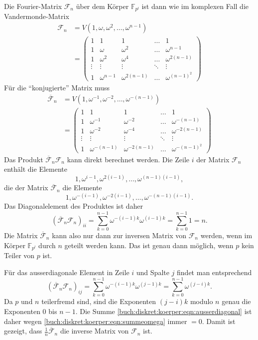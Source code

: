 Die Fourier-Matrix $\mathscr{F}_n$ über dem Körper $\mathbb{F}_{p^l}$
ist dann wie im komplexen Fall die Vandermonde-Matrix
\begin{align*}
\mathscr{F}_n
&=
V(1,\omega,\omega^2,\dots,\omega^{n-1})
\\
&=
\begin{pmatrix}
1&1&1&\dots&1\\
1&\omega&\omega^2&\dots&\omega^{n-1}\\
1&\omega^2&\omega^4&\dots&\omega^{2(n-1)}\\
\vdots&\vdots&\vdots&\ddots&\vdots\\
1&\omega^{n-1}&\omega^{2(n-1)}&\dots&\omega^{(n-1)^2}
\end{pmatrix}
\end{align*}
Für die ``konjugierte'' Matrix muss
\begin{align*}
\overline{\mathscr{F}}_n
&=
V(1,\omega^{-1},\omega^{-2},\dots,\omega^{-(n-1)})
\\
&=
\begin{pmatrix}
1&1&1&\dots&1\\
1&\omega^{-1}&\omega^{-2}&\dots&\omega^{-(n-1)}\\
1&\omega^{-2}&\omega^{-4}&\dots&\omega^{-2(n-1)}\\
\vdots&\vdots&\vdots&\ddots&\vdots\\
1&\omega^{-(n-1)}&\omega^{-2(n-1)}&\dots&\omega^{-(n-1)^2}
\end{pmatrix}
\end{align*}
Das Produkt $\overline{\mathscr{F}}_n\mathscr{F}_n$ kann direkt
berechnet werden.
Die Zeile $i$ der Matrix $\mathscr{F}_n$ enthält die Elemente 
\[
1,\omega^{i-1},\omega^{2(i-1)},\dots,\omega^{(n-1)(i-1)},
\]
die der Matrix $\overline{\mathscr{F}}_n$ die Elemente
\[
1,\omega^{-(i-1)},\omega^{-2(i-1)},\dots,\omega^{-(n-1)(i-1)}.
\]
Das Diagonalelement des Produktes ist daher
\[
(\overline{\mathscr{F}}_n
\mathscr{F}_n)_{ii}
=
\sum_{k=0}^{n-1}
\omega^{-(i-1)k}\omega^{(i-1)k}
=
\sum_{k=0}^{n-1} 1
=
n.
\]
Die Matrix $\overline{\mathscr{F}}_n$ kann also nur dann zur
inversen Matrix von $\mathscr{F}_n$ werden, wenn im Körper
$\mathbb{F}_{p^l}$ durch $n$ geteilt werden kann.
Das ist genau dann möglich, wenn $p$ kein Teiler von $p$ ist.

Für das ausserdiagonale Element in Zeile $i$ und Spalte $j$
findet man entsprechend
\begin{equation}
(\overline{\mathscr{F}}_n
\mathscr{F}_n)_{i\!j}
=
\sum_{k=0}^{n-1}
\omega^{-(i-1)k}\omega^{(j-1)k}
=
\sum_{k=0}^{n-1} \omega^{(j-i)k}.
\label{buch:diskret:koerper:eqn:ausserdiagonal}
\end{equation}
Da $p$ und $n$ teilerfremd sind, sind die Exponenten $(j-i)k$
modulo $n$ genau die Exponenten $0$ bis $n-1$.
Die Summe
\eqref{buch:diskret:koerper:eqn:ausserdiagonal}
ist daher wegen
\eqref{buch:diskret:koerper:eqn:summeomega}
immer $=0$.
Damit ist gezeigt, dass $\frac1n\overline{\mathscr{F}}_n$ die
inverse Matrix von $\mathscr{F}_n$ ist.

